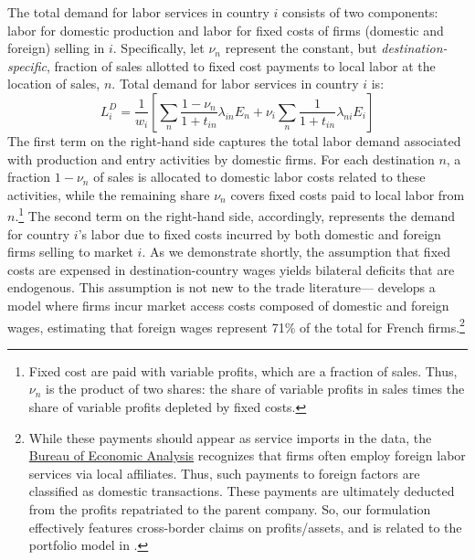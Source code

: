 \documentclass[12pt]{article}
\begin{document}
The total demand for labor services in country $i$ consists of two components: labor for domestic production and labor for fixed costs of firms (domestic and foreign) selling in $i$. Specifically, let $\nu_n$ represent the constant, but \textit{destination-specific}, fraction of sales allotted to fixed cost payments to local labor at the location of sales, $n$. Total demand for labor services in country $i$ is:
\begin{equation}
L_{i}^{D}=\frac{1}{w_{i}}\left[\sum_{n}\frac{1-\nu_{n}}{1+t_{in}}\lambda_{in}E_{n}+\nu_{i}\sum_{n}\frac{1}{1+t_{in}}\lambda_{ni}E_{i}\right]
\end{equation}
The first term on the right-hand side captures the total labor demand associated with production and entry activities by domestic firms. For each destination $n$, a fraction $1 - \nu_n$ of sales is allocated to domestic labor costs related to these activities, while the remaining share $\nu_n$ covers fixed costs paid to local labor from $n$.\footnote{Fixed cost are paid with variable profits, which are a fraction of sales. Thus, $\nu_n$ is the product of two shares: the share of variable profits in sales times the share of variable profits depleted by fixed costs.}  The second term on the right-hand side, accordingly, represents the demand for country $i$'s labor due to fixed costs incurred by both domestic and foreign firms selling to market $i$. As we demonstrate shortly, the assumption that fixed costs are expensed in destination-country wages yields bilateral deficits that are endogenous. This assumption is not new to the trade literature---\citet{arkolakis_jpe} develops a model where firms incur market access costs composed of domestic and foreign wages, estimating that foreign wages represent 71\% of the total for French firms.\footnote{While these payments should appear as service imports in the data, the \href{https://www.bea.gov/sites/default/files/2018-01/international_itas.pdf}{Bureau of Economic Analysis} recognizes that firms often employ foreign labor services via local affiliates. Thus, such payments to foreign factors are classified as domestic transactions. These payments are ultimately deducted from the profits repatriated to the parent company. So, our formulation effectively features cross-border claims on profits/assets, and is related to the portfolio model in \citet{caliendo2018impact}.}
\end{document}
